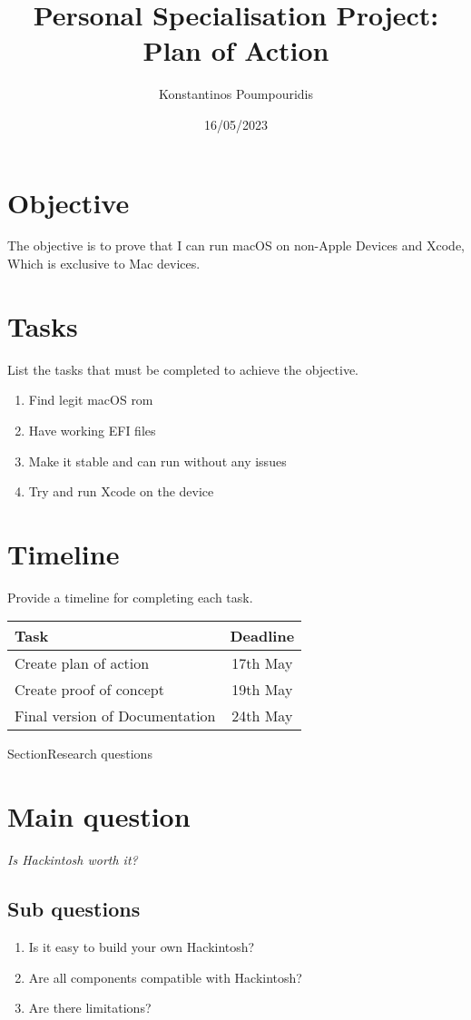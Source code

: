 \documentclass{article}
\title{Personal Specialisation Project: Plan of Action}
\author{Konstantinos Poumpouridis}
\date{16/05/2023}
\begin{document}
\section{Objective}
The objective is to prove that I can run macOS on non-Apple Devices and Xcode, Which is exclusive to Mac devices.
\section{Tasks}

List the tasks that must be completed to achieve the objective.

\begin{enumerate}
\item Find legit macOS rom
\item Have working EFI files
\item Make it stable and can run without any issues
\item Try and run Xcode on the device
\end{enumerate}

\section{Timeline}

Provide a timeline for completing each task.

\begin{table}[h]
\centering
\begin{tabular}{|l|c|}
\hline
\textbf{Task} & \textbf{Deadline} \\
\hline
Create plan of action & 17th May \\
Create proof of concept & 19th May \\
Final version of Documentation & 24th May \\
\hline
\end{tabular}
\end{table}

Section{Research questions}

\section{Main question}
\textit{Is Hackintosh worth it?}

\subsection{Sub questions}
\begin{enumerate}
    \item Is it easy to build your own Hackintosh?
    \item Are all components compatible with Hackintosh?
    \item Are there limitations?
\end{enumerate}
\newpage
\end{document}
